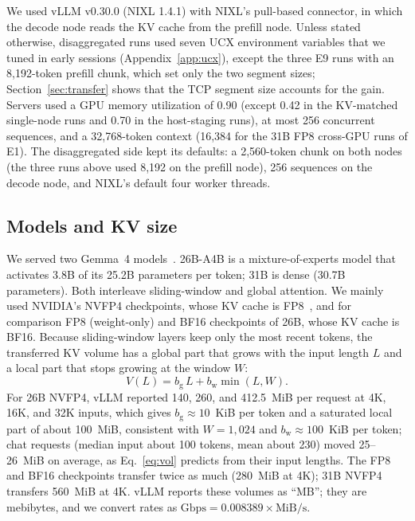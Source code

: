 \documentclass[11pt]{article}
\begin{document}
We used vLLM v0.30.0 (NIXL 1.4.1) with NIXL's pull-based connector, in which the decode node reads the KV cache from the prefill node. Unless stated otherwise, disaggregated runs used seven UCX environment variables that we tuned in early sessions (Appendix~\ref{app:ucx}), except the three E9 runs with an 8,192-token prefill chunk, which set only the two segment sizes; Section~\ref{sec:transfer} shows that the TCP segment size accounts for the gain. Servers used a GPU memory utilization of 0.90 (except 0.42 in the KV-matched single-node runs and 0.70 in the host-staging runs), at most 256 concurrent sequences, and a 32,768-token context (16,384 for the 31B FP8 cross-GPU runs of E1). The disaggregated side kept its defaults: a 2,560-token chunk on both nodes (the three runs above used 8,192 on the prefill node), 256 sequences on the decode node, and NIXL's default four worker threads.

\subsection{Models and KV size}\label{sec:kv}
We served two Gemma~4 models~\cite{gemma4}. 26B-A4B is a mixture-of-experts model that activates 3.8B of its 25.2B parameters per token; 31B is dense (30.7B parameters). Both interleave sliding-window and global attention. We mainly used NVIDIA's NVFP4 checkpoints, whose KV cache is FP8~\cite{nvfp4ckpt}, and for comparison FP8 (weight-only) and BF16 checkpoints of 26B, whose KV cache is BF16. Because sliding-window layers keep only the most recent tokens, the transferred KV volume has a global part that grows with the input length $L$ and a local part that stops growing at the window $W$:
\begin{equation}\label{eq:vol}
V(L) = b_{\mathrm{g}}\,L + b_{\mathrm{w}} \min(L, W).
\end{equation}
For 26B NVFP4, vLLM reported 140, 260, and 412.5~MiB per request at 4K, 16K, and 32K inputs, which gives $b_{\mathrm{g}} \approx 10$~KiB per token and a saturated local part of about 100~MiB, consistent with $W = 1{,}024$ and $b_{\mathrm{w}} \approx 100$~KiB per token; chat requests (median input about 100 tokens, mean about 230) moved 25--26~MiB on average, as Eq.~\eqref{eq:vol} predicts from their input lengths. The FP8 and BF16 checkpoints transfer twice as much (280~MiB at 4K); 31B NVFP4 transfers 560~MiB at 4K. vLLM reports these volumes as ``MB''; they are mebibytes, and we convert rates as $\text{Gbps} = 0.008389 \times \text{MiB}/\text{s}$.
\end{document}
